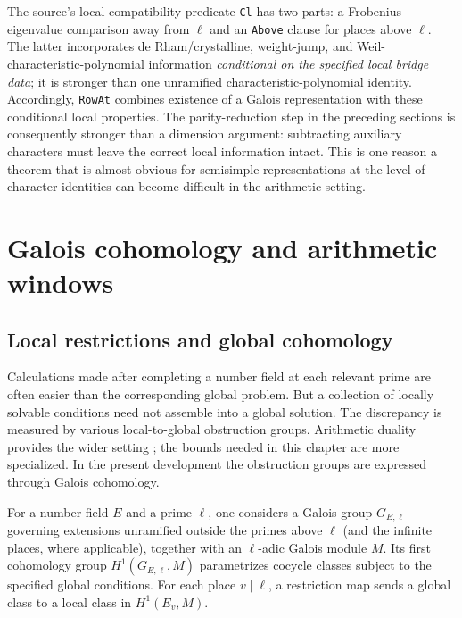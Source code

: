 \documentclass[11pt,openany,oneside]{scrbook}
\theoremstyle{definition}
\theoremstyle{remark}
\begin{document}
The source's local-compatibility predicate \texttt{Cl} has two parts: a Frobenius-eigenvalue comparison away from $\ell$ and an \texttt{Above} clause for places above $\ell$. The latter incorporates de Rham/crystalline, weight-jump, and Weil-characteristic-polynomial information \emph{conditional on the specified local bridge data}; it is stronger than one unramified characteristic-polynomial identity. Accordingly, \texttt{RowAt} combines existence of a Galois representation with these conditional local properties. The parity-reduction step in the preceding sections is consequently stronger than a dimension argument: subtracting auxiliary characters must leave the correct local information intact. This is one reason a theorem that is almost obvious for semisimple representations at the level of character identities can become difficult in the arithmetic setting.

\chapter{Galois cohomology and arithmetic windows}\label{ch:iwasawa}

\section{Local restrictions and global cohomology}

Calculations made after completing a number field at each relevant prime are often easier than the corresponding global problem. But a collection of locally solvable conditions need not assemble into a global solution. The discrepancy is measured by various local-to-global obstruction groups. Arithmetic duality provides the wider setting \parencite{Milne2006}; the bounds needed in this chapter are more specialized. In the present development the obstruction groups are expressed through Galois cohomology.

For a number field $E$ and a prime $\ell$, one considers a Galois group $G_{E,\ell}$ governing extensions unramified outside the primes above $\ell$ (and the infinite places, where applicable), together with an $\ell$-adic Galois module $M$. Its first cohomology group $H^1(G_{E,\ell},M)$ parametrizes cocycle classes subject to the specified global conditions. For each place $v\mid\ell$, a restriction map sends a global class to a local class in $H^1(E_v,M)$.
\end{document}

